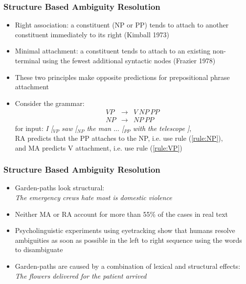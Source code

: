 \begin{frame}
\frametitle{Structure Based Ambiguity Resolution}
\begin{itemize}
  \item Right association: a constituent (NP or PP) tends to attach to
  another constituent immediately to its right (Kimball 1973)
  \item Minimal attachment: a constituent tends to attach to an
  existing non-terminal using the fewest additional syntactic nodes
  (Frazier 1978)
  \item These two principles make opposite predictions for
  prepositional phrase attachment
  \item Consider the grammar:
\begin{eqnarray}
VP &\rightarrow& V\ NP\ PP \label{rule:VP}\\
NP &\rightarrow& NP\ PP \label{rule:NP}
\end{eqnarray}  
  for input: {\em I [$_{VP}$ saw [$_{NP}$ the man $\ldots$ [$_{PP}$ with
  the telescope ]}, \\
  RA predicts that the PP attaches to the NP, i.e. use rule (\ref{rule:NP}), \\
  and MA predicts V attachment, i.e. use rule (\ref{rule:VP})
\end{itemize}

\end{frame}

\begin{frame}
\frametitle{Structure Based Ambiguity Resolution}
\begin{itemize}
  \item Garden-paths look structural:\\
  {\rm\it The emergency crews hate most is
  domestic violence}
  \item Neither MA or RA account for more than 55\% of the cases in
  real text 
  \item Psycholinguistic experiments using eyetracking show that humans resolve
  ambiguities as soon as possible in the left to right sequence using
  the words to disambiguate
  \item Garden-paths are caused by a combination of lexical and structural effects:\\ 
  {\rm\it The flowers delivered for the patient arrived}
\end{itemize}

\end{frame}

